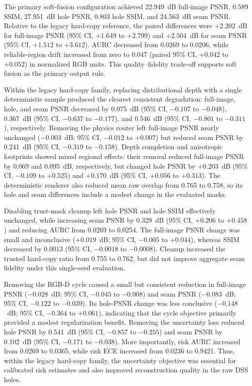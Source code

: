 \documentclass[letterpaper,10pt,conference]{ieeeconf}
\begin{document}
The primary soft-fusion configuration achieved 22.949~dB full-image PSNR,
0.589 SSIM, 27.951~dB hole PSNR, 0.803 hole SSIM, and 24.563~dB seam
PSNR. Relative to the legacy hard-copy reference, the paired differences were
$+2.202$~dB for full-image PSNR (95\% CI, $+1.649$ to $+2.799$) and
$+2.504$~dB for seam PSNR (95\% CI, $+1.512$ to $+3.612$). AURC decreased
from 0.0269 to 0.0206, while reliable-region drift increased from zero to
0.047 (paired 95\% CI, $+0.042$ to $+0.052$) in normalized RGB units. This
quality--fidelity trade-off supports soft fusion as the primary output rule.

Within the legacy hard-copy family, replacing distributional depth with a
single deterministic sample produced the clearest consistent degradation:
full-image, hole, and seam PSNR decreased by 0.075~dB (95\% CI, $-0.107$ to
$-0.048$), 0.367~dB (95\% CI, $-0.637$ to $-0.177$), and 0.546~dB (95\%
CI, $-0.801$ to $-0.311$), respectively. Removing the physics router left
full-image PSNR nearly unchanged ($-0.003$~dB; 95\% CI, $-0.012$ to
$+0.007$) but reduced seam PSNR by 0.241~dB (95\% CI, $-0.319$ to
$-0.158$). Depth completion and anisotropic footprints showed mixed regional
effects: their removal reduced full-image PSNR by 0.069 and 0.095~dB,
respectively, but changed hole PSNR by $+0.203$~dB (95\% CI, $-0.109$ to
$+0.525$) and $+0.170$~dB (95\% CI, $+0.056$ to $+0.313$). The deterministic
renderer also reduced mean raw overlap from 0.765 to 0.758, so its hole and
seam differences include a modest change in the evaluated masks.

Disabling trust-mask cleanup left hole PSNR and hole SSIM effectively
unchanged, while increasing seam PSNR by 0.329~dB (95\% CI, $+0.206$ to
$+0.458$) and reducing AURC from 0.0269 to 0.0254. The full-image PSNR change
was small and inconclusive ($+0.019$~dB; 95\% CI, $-0.005$ to $+0.044$),
whereas SSIM decreased by 0.0013 (95\% CI, $-0.0018$ to $-0.0008$). Cleanup
increased the trusted hard-copy ratio from 0.755 to 0.762, but did not improve
aggregate seam fidelity under this single-seed evaluation.

Removing the RGB-D cycle caused a small but consistent reduction in
full-image PSNR ($-0.028$~dB; 95\% CI, $-0.045$ to $-0.008$) and seam PSNR
($-0.083$~dB; 95\% CI, $-0.122$ to $-0.039$). Its hole-PSNR change was less
conclusive ($-0.148$~dB; 95\% CI, $-0.364$ to $+0.061$), indicating that the
cycle objective primarily provided a modest regularization benefit. Removing
the uncertainty loss reduced hole PSNR by 0.541~dB (95\% CI, $-0.857$ to
$-0.255$) and seam PSNR by 0.102~dB (95\% CI, $-0.171$ to $-0.038$). More
importantly, risk AURC increased from 0.0269 to 0.0365, while risk ECE
increased from 0.0236 to 0.9421. Thus, within the legacy hard-copy family,
the uncertainty objective was essential for calibrated risk estimates and
also improved reconstruction quality in the raw DSS holes.
\end{document}
